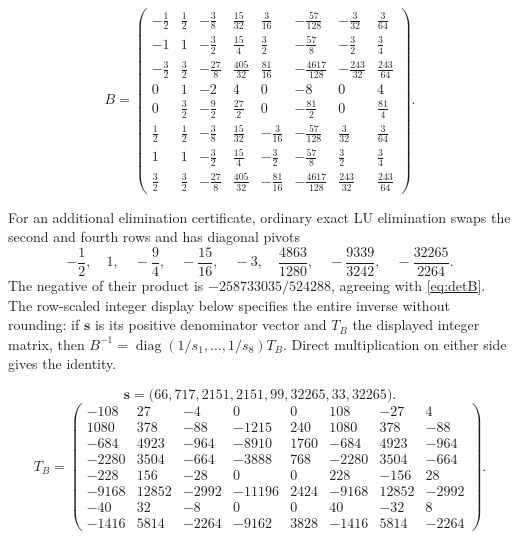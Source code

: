 \documentclass[11pt,a4paper]{article}
\numberwithin{equation}{section}
\theoremstyle{definition}
\theoremstyle{remark}
\DeclareMathOperator{\diag}{diag}
\begin{document}
\begingroup\small\setlength{\arraycolsep}{3pt}
\renewcommand{\arraystretch}{1.7}
\begin{equation}\label{eq:Bfull}
B=\begin{pmatrix}
-\frac{1}{2} & \frac{1}{2} & -\frac{3}{8} & \frac{15}{32} & \frac{3}{16} & -\frac{57}{128} & -\frac{3}{32} & \frac{3}{64} \\
-1 & 1 & -\frac{3}{2} & \frac{15}{4} & \frac{3}{2} & -\frac{57}{8} & -\frac{3}{2} & \frac{3}{4} \\
-\frac{3}{2} & \frac{3}{2} & -\frac{27}{8} & \frac{405}{32} & \frac{81}{16} & -\frac{4617}{128} & -\frac{243}{32} & \frac{243}{64} \\
0 & 1 & -2 & 4 & 0 & -8 & 0 & 4 \\
0 & \frac{3}{2} & -\frac{9}{2} & \frac{27}{2} & 0 & -\frac{81}{2} & 0 & \frac{81}{4} \\
\frac{1}{2} & \frac{1}{2} & -\frac{3}{8} & \frac{15}{32} & -\frac{3}{16} & -\frac{57}{128} & \frac{3}{32} & \frac{3}{64} \\
1 & 1 & -\frac{3}{2} & \frac{15}{4} & -\frac{3}{2} & -\frac{57}{8} & \frac{3}{2} & \frac{3}{4} \\
\frac{3}{2} & \frac{3}{2} & -\frac{27}{8} & \frac{405}{32} & -\frac{81}{16} & -\frac{4617}{128} & \frac{243}{32} & \frac{243}{64}
\end{pmatrix}.
\end{equation}
\endgroup

For an additional elimination certificate, ordinary exact LU elimination
swaps the second and fourth rows and has diagonal pivots
\[
 -\frac12,\quad 1,\quad-\frac94,\quad-\frac{15}{16},\quad-3,
 \quad\frac{4863}{1280},\quad-\frac{9339}{3242},
 \quad-\frac{32265}{2264}.
\]
The negative of their product is $-258733035/524288$, agreeing with
\eqref{eq:detB}. The row-scaled integer display below specifies the entire
inverse without rounding: if $\mathbf s$ is its positive denominator
vector and $T_B$ the displayed integer matrix, then
$B^{-1}=\diag(1/s_1,\ldots,1/s_8)T_B$. Direct multiplication on either
side gives the identity.

\[
\mathbf s=\bigl(66,717,2151,2151,99,32265,33,32265\bigr).
\]
\begingroup\small\setlength{\arraycolsep}{3pt}
\[
T_B=\begin{pmatrix}
-108 & 27 & -4 & 0 & 0 & 108 & -27 & 4 \\
1080 & 378 & -88 & -1215 & 240 & 1080 & 378 & -88 \\
-684 & 4923 & -964 & -8910 & 1760 & -684 & 4923 & -964 \\
-2280 & 3504 & -664 & -3888 & 768 & -2280 & 3504 & -664 \\
-228 & 156 & -28 & 0 & 0 & 228 & -156 & 28 \\
-9168 & 12852 & -2992 & -11196 & 2424 & -9168 & 12852 & -2992 \\
-40 & 32 & -8 & 0 & 0 & 40 & -32 & 8 \\
-1416 & 5814 & -2264 & -9162 & 3828 & -1416 & 5814 & -2264
\end{pmatrix}.
\]
\endgroup
\end{document}

